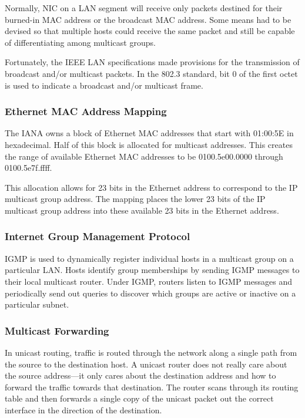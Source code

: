 \cite{cisco:multicast}
Normally, \ac{NIC} on a \ac{LAN} segment will receive only
packets destined for their burned-in MAC address or the broadcast MAC
address. Some means had to be devised so that multiple hosts could receive
the same packet and still be capable of differentiating among multicast
groups.

Fortunately, the IEEE \ac{LAN} specifications made provisions for the
transmission of broadcast and/or multicast packets. In the 802.3 standard,
bit 0 of the first octet is used to indicate a broadcast and/or multicast
frame.

\subsubsection{Ethernet MAC Address Mapping}

\cite{cisco:multicast}
The \ac{IANA} owns a block of Ethernet MAC addresses that start with 01:00:5E in
hexadecimal. Half of this block is allocated for multicast addresses. This
creates the range of available Ethernet MAC addresses to be 0100.5e00.0000
through 0100.5e7f.ffff.

This allocation allows for 23 bits in the Ethernet address to correspond to
the IP multicast group address. The mapping places the lower 23 bits of the
IP multicast group address into these available 23 bits in the Ethernet
address.

\subsubsection{Internet Group Management Protocol}

\cite{cisco:multicast}
\ac{IGMP} is used to dynamically register individual hosts in a multicast group
on a particular \ac{LAN}. Hosts identify group memberships by sending
\ac{IGMP}
messages to their local multicast router. Under \ac{IGMP}, routers listen to
\ac{IGMP} messages and periodically send out queries to discover which groups
are active or inactive on a particular subnet.


\subsubsection{Multicast Forwarding}

\cite{cisco:multicast}
In unicast routing, traffic is routed through the network along a single
path from the source to the destination host. A unicast router does not
really care about the source address—it only cares about the destination
address and how to forward the traffic towards that destination. The router
scans through its routing table and then forwards a single copy of the
unicast packet out the correct interface in the direction of the
destination.

